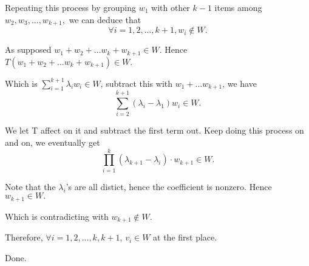 \documentclass[12pt]{article}%
\begin{document}
Repeating this process by grouping $w_1$ with other $k-1$ items among $w_2,w_3,...,w_{k+1},$ we can deduce that $$\forall i=1,2,...,k+1, w_{i} \notin W.$$

As supposed $w_1+w_2+\dots w_k + w_{k+1} \in W.$ Hence $T(w_1+w_2+\dots w_k + w_{k+1} )\in W.$ 

Which is $\sum_{i=1}^{k+1}\lambda_{i}w_i \in W$, subtract this with $w_1+...w_{k+1}$, we have $$\sum_{i=2}^{k+1}(\lambda_{i}-\lambda_1)w_{i} \in W.$$

We let T affect on it and subtract the first term out. Keep doing this process on and on, we eventually get $$\prod_{i=1}^{k}(\lambda_{k+1}-\lambda_i) \cdot w_{k+1} \in W.$$

Note that the $\lambda_i$'s are all distict, hence the coefficient is nonzero. Hence $w_{k+1} \in W.$

Which is contradicting with $w_{k+1} \notin W.$

Therefore, $\forall i=1,2,...,k,k+1$, $v_i \in W$ at the first place.

Done.
\end{document}
